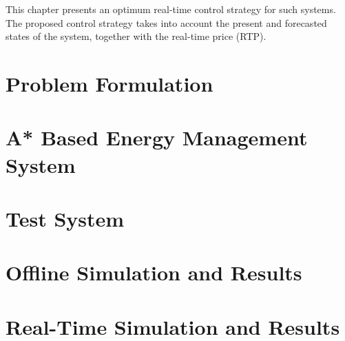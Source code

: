 This chapter presents an optimum real-time control strategy for such systems. The proposed control strategy takes into account the present and forecasted states of the system, together with the real-time price (RTP).


\section{Problem Formulation} \label{formulation}


\section{A* Based Energy Management System} \label{A*}


\section{Test System} \label{sys}


\section{Offline Simulation and Results} \label{OFF}


\section{Real-Time Simulation and Results} \label{RT}



